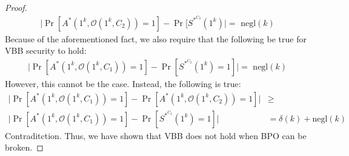 \documentclass{article}
\begin{document}
\begin{proof}
\begin{align*}
            \biggr\lvert\Pr[A^*(1^k, \mathcal{O}(1^k, C_2)) = 1] - \Pr[S^{*^{C_2}}(1^k)\biggr\rvert = \text{ negl$(k)$}
        \end{align*}
    Because of the aforementioned fact, we also require that the following be true for VBB security to hold:
        \begin{align*}
            \biggr\lvert\Pr[A^*(1^k, \mathcal{O}(1^k, C_1)) = 1] - \Pr[S^{*^{C_2}}(1^k) = 1]\biggr\rvert = \text{ negl$(k)$}
        \end{align*}
    However, this cannot be the case. Instead, the following is true:
        \begin{align*}
            \biggr\lvert\Pr[A^*(1^k, \mathcal{O}(1^k, C_1)) = 1] - \Pr[A^*(1^k, \mathcal{O}(1^k, C_2)) = 1] \biggr\rvert &\geq\\
            \biggr\lvert\Pr[A^*(1^k, \mathcal{O}(1^k, C_1)) = 1] - \Pr[S^{*^{C_2}}(1^k) = 1]\biggr\rvert &= \delta(k) + \text{negl$(k)$}
        \end{align*}
    Contraditction. Thus, we have shown that VBB does not hold when BPO can be broken.
\end{proof}
\end{document}
